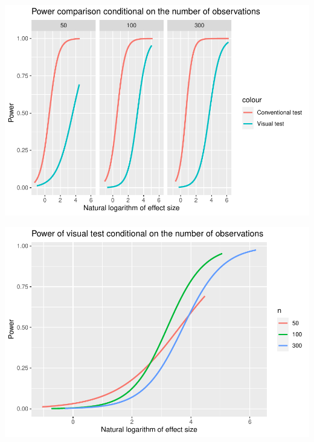 \documentclass[]{interact}
\theoremstyle{plain}%
\theoremstyle{definition}
\theoremstyle{remark}
\begin{document}
\includegraphics{paper_comparison_files/figure-latex/power-vs-log-effect-size-given-number-of-observations-1.pdf}

\includegraphics{paper_comparison_files/figure-latex/power-of-visual-test-given-number-of-observations-1.pdf}



\end{document}
